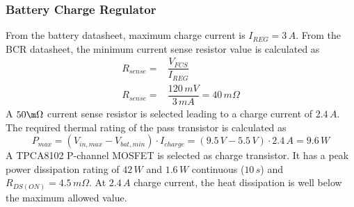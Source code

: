 \subsubsection{Battery Charge Regulator}
%
From the battery datasheet, maximum charge current is $I_{REG}=3\,A$. From the \ac{BCR} datasheet, the minimum current sense resistor value is calculated as
%
\begin{equation}
\begin{split}
R_{sense}=&\dfrac{V_{FCS}}{I_{REG}}\\
R_{sense}=&\dfrac{120\,mV}{3\,mA}=40\,m\Omega
\end{split}
\end{equation}
%
A $50\m \Omega$ current sense resistor is selected leading to a charge current of $2.4\,A$.
%
The required thermal rating of the pass transistor is calculated as
%
\begin{equation}
P_{max}=(V_{in,max}-V_{bat,min})\cdot I_{charge}=(9.5\,V-5.5\,V)\cdot 2.4\,A=9.6\,W
\end{equation}
%
A TPCA8102 P-channel MOSFET is selected as charge transistor. It has a peak power dissipation rating of $42\,W$ and $1.6\,W$ continuous ($10\,s$) and $R_{DS(ON)}=4.5\,m \Omega$. At $2.4\,A$ charge current, the heat dissipation is well below the maximum allowed value.
%


